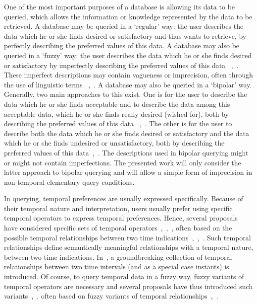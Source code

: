 \documentclass[runningheads,a4paper]{llncs}
\begin{document}
One of the most important purposes of a database is allowing its data to be queried, which allows the information or knowledge represented by the data to be retrieved. A database may be queried in a `regular' way: the user describes the data which he or she finds desired or satisfactory and thus wants to retrieve, by perfectly describing the preferred values of this data. A database may also be queried in a `fuzzy' way: the user describes the data which he or she finds desired or satisfactory by imperfectly describing the preferred values of this data ~\cite{Zadrozny2008hrfipd},~\cite{DeCaluwe2007ijis}. These imperfect descriptions may contain vagueness or imprecision, often through the use of linguistic terms ~\cite{Devos1998jql},~\cite{Kacprzyk2001is}. A database may also be queried in a `bipolar' way. Generally, two main approaches to this exist. One is for the user to describe the data which he or she finds acceptable and to describe the data among this acceptable data, which he or she finds really desired (wished-for), both by describing the preferred values of this data ~\cite{Dubois2008hrfipd},~\cite{Dubois2002lnai}. The other is for the user to describe both the data which he or she finds desired or satisfactory and the data which he or she finds undesired or unsatisfactory, both by describing the preferred values of this data~\cite{DeTre2010ieeetfs},~\cite{Matthe2011ijis}. The descriptions used in bipolar querying might or might not contain imperfections. The presented work will only consider the latter approach to bipolar querying and will allow a simple form of imprecision in non-temporal elementary query conditions.

In querying, temporal preferences are usually expressed specifically. Because of their temporal nature and interpretation, users usually prefer using specific temporal operators to express temporal preferences. Hence, several proposals have considered specific sets of temporal operators~\cite{Galindo2001},~\cite{Pons2012ijcis},~\cite{Schockaert2008ieeetfs}, often based on the possible temporal relationships between two time indications~\cite{Galindo2001},~\cite{Pons2012ijcis},~\cite{Schockaert2008ieeetfs}. Such temporal relationships define semantically meaningful relationships with a temporal nature, between two time indications. In~\cite{Allen1983cacm}, a groundbreaking collection of temporal relationships between two time intervals (and as a special case instants) is introduced. Of course, to query temporal data in a fuzzy way, fuzzy variants of temporal operators are necessary and several proposals have thus introduced such variants~\cite{Galindo2001},~\cite{Pons2012ipmu}, often based on fuzzy variants of temporal relationships~\cite{Schockaert2008ieeetfs},~\cite{Pons2013ijufkbs}.
\end{document}
